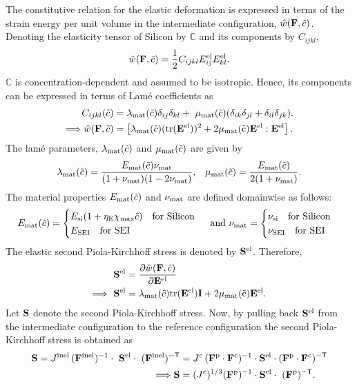 The constitutive relation for the elastic deformation is expressed in terms of the strain energy per unit volume in the intermediate configuration, $\hat{w}(\mathbf{F}, \tilde{c})$. Denoting the elasticity tensor of Silicon by $\mathbb{C}$ and its components by $C_{ijkl}$,
\begin{gather}
\hat{w}(\mathbf{F}, \tilde{c}) = \frac{1}{2} C_{ijkl} E_{ij}^{{\rm{el}}} E_{kl}^{{\rm{el}}}.
\end{gather}
$\mathbb{C}$ is concentration-dependent and assumed to be isotropic. Hence, its components can be expressed in terms of Lam\'{e} coefficients as 
\begin{align}
 C_{ijkl}(\tc) &= \lambda_{\rm{mat}}(\tc)\delta_{ij} \delta_{kl} +  \mu_{\rm{mat}}(\tc)(\delta_{ik} \delta_{jl} + \delta_{il} \delta_{jk}). \\
\implies \hat{w}(\F, \tc) &= \left[\lamSic (\tr{\E^\el})^2 + 2 \muSic \E^{\el}:\E^{\el}\right].
\end{align}
The lam\'{e} parameters, $\lambda_{\rm{mat}}(\tilde{c})$ and $\mu_{\rm{mat}}(\tilde{c})$ are given by
\begin{align}
\lambda_{\rm{mat}}(\tilde{c}) = \frac{E_{\rm{mat}}(\tilde{c}) \nu_{\rm{mat}}}{(1+\nu_{\rm{mat}})(1-2\nu_{\rm{mat}})},
&& \mu_{\rm{mat}}(\tilde{c}) = \frac{E_{\rm{mat}}(\tilde{c})}{2(1+\nu_{\rm{mat}})}. \nonumber
\end{align}
The material properties $E_{\rm{mat}}(\tilde{c})$ and $\nu_{\rm{mat}}$ are defined domainwise as follows:
\[E_{\rm{mat}}(\tilde{c}) = \begin{cases}
 E_{\text{si}}(1 + \eta_{\rm{E}} \chi_{\rm{max}} \tilde{c}) \text{\quad for Silicon} \\
 E_{\rm{SEI}} \text{\quad for SEI }
\end{cases} \text{ and }
\nu_{\rm{mat}} = \begin{cases}
\nu_{{\rm{si}}} \text{\quad for Silicon} \\
\nu_{\rm{SEI}} \text{\quad for SEI }
\end{cases}\]
The elastic second Piola-Kirchhoff stress is denoted by $\mathbf{S}^{\rm{el}}$. Therefore, 
\begin{align}
\PKS^\el &= \pdiff{\hat{w}(\F, \tc)}{\E^{\el}}\nonumber \\
\implies  \PKS^\el &= \lamSic \tr{\E^\el}\I + 2 \muSic \E^\el. \label{eq:Sel_tensor}
\end{align}
Let $\mathbf{S}$ denote the second Piola-Kirchhoff stress. Now, by pulling back $\mathbf{S}^{{\rm{el}}}$ from the intermediate configuration to the reference configuration \citep{2010Gurtin} the second Piola-Kirchhoff stress is obtained as
\begin{align}
    \PKS = J^{\inel} \, \inv{\F^\inel} \cdot  \PKS^\el \cdot  \invT{\F^\inel} &= \jc \, \inv{\F^{\p} \cdot \F^{\c}} \cdot \PKS^{\el} \cdot \invT{\F^\p \cdot \F^\c}\nonumber\\
\implies \PKS &= (\jc)^{1/3} \inv{\F^\p} \cdot \PKS^{\el} \cdot  \invT{\F^\p}.\label{eq:S_tensor}
\end{align}
